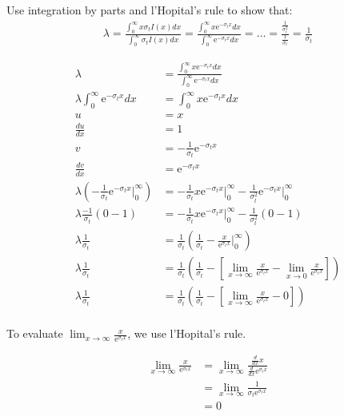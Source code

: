 \documentclass{hw}
\begin{document}
\problem{}
    Use integration by parts and l'Hopital's rule to show that:
    \begin{align*}
        \lambda = \frac{\int_0^\infty x \sigma_t I(x) dx}{\int_0^\infty \sigma_t I(x) dx} = \frac{\int_0^\infty x \mathrm{e}^{-\sigma_t x} dx }{\int_0^\infty \mathrm{e}^{-\sigma_t x} dx} = \ldots = \frac{\frac{1}{\sigma_t^2}}{\frac{1}{\sigma_t}} = \frac{1}{\sigma_t} 
    \end{align*}

\solution
    \begin{align*}
        \lambda &= \frac{\int_0^\infty x \mathrm{e}^{-\sigma_t x} dx }{\int_0^\infty \mathrm{e}^{-\sigma_t x} dx} \\
        \lambda \int_0^\infty \mathrm{e}^{-\sigma_t x} dx &= \int_0^\infty x \mathrm{e}^{-\sigma_t x} dx \\
        u &= x \\
        \frac{du}{dx} &= 1 \\
        v &= -\frac{1}{\sigma_t} \mathrm{e}^{-\sigma_t x} \\
        \frac{dv}{dx} &= \mathrm{e}^{-\sigma_t x} \\
        \lambda \left(-\frac{1}{\sigma_t} \mathrm{e}^{-\sigma_t x} \Big|_0^\infty\right) &= -\frac{1}{\sigma_t} x \mathrm{e}^{-\sigma_t x}\Big|_0^\infty - \frac{1}{\sigma_t^2}\mathrm{e}^{-\sigma_t x}\Big|_0^\infty \\
        \lambda \frac{-1}{\sigma_t} \left( 0 - 1 \right) &= -\frac{1}{\sigma_t} x \mathrm{e}^{-\sigma_t x}\Big|_0^\infty - \frac{1}{\sigma_t^2} \left( 0 - 1 \right) \\
        \lambda \frac{1}{\sigma_t} &= \frac{1}{\sigma_t} \left( \frac{1}{\sigma_t} - \frac{x}{\mathrm{e}^{\sigma_t x}}\Big|_0^\infty \right) \\
        \lambda \frac{1}{\sigma_t} &= \frac{1}{\sigma_t} \left( \frac{1}{\sigma_t} - \left[ \lim_{x\to\infty}\frac{x}{\mathrm{e}^{\sigma_t x}} - \lim_{x\to0}\frac{x}{\mathrm{e}^{\sigma_t x}} \right] \right) \\
        \lambda \frac{1}{\sigma_t} &= \frac{1}{\sigma_t} \left( \frac{1}{\sigma_t} - \left[ \lim_{x\to\infty}\frac{x}{\mathrm{e}^{\sigma_t x}} - 0 \right] \right) \\
    \end{align*}

    To evaluate $\lim_{x\to\infty}\frac{x}{\mathrm{e}^{\sigma_t x}}$, we use l'Hopital's rule.

    \begin{align*}
        \lim_{x\to\infty}\frac{x}{\mathrm{e}^{\sigma_t x}} &= \lim_{x\to\infty}\frac{\frac{d}{dx}x}{\frac{d}{dx}\mathrm{e}^{\sigma_t x}} \\
        &= \lim_{x\to\infty}\frac{1}{\sigma_t \mathrm{e}^{\sigma_t x}} \\
        &= 0
    \end{align*}
\end{document}
